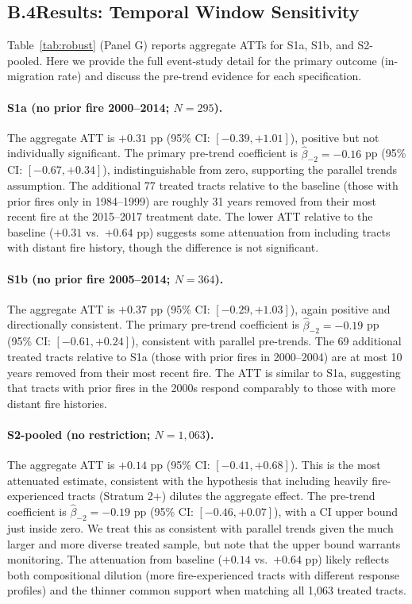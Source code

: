 \documentclass[12pt]{article}
\begin{document}
\subsection*{B.4\quad Results: Temporal Window Sensitivity}

Table~\ref{tab:robust} (Panel G) reports aggregate ATTs for S1a, S1b, and S2-pooled.
Here we provide the full event-study detail for the primary outcome (in-migration rate)
and discuss the pre-trend evidence for each specification.

\paragraph{S1a (no prior fire 2000--2014; $N = 295$).}
The aggregate ATT is $+0.31$ pp (95\% CI: $[-0.39, +1.01]$), positive but not
individually significant.
The primary pre-trend coefficient is $\hat{\beta}_{-2} = -0.16$ pp
(95\% CI: $[-0.67, +0.34]$), indistinguishable from zero, supporting the parallel
trends assumption.
The additional 77 treated tracts relative to the baseline (those with prior fires
only in 1984--1999) are roughly 31 years removed from their most recent fire at
the 2015--2017 treatment date.
The lower ATT relative to the baseline ($+0.31$ vs.\ $+0.64$ pp) suggests
some attenuation from including tracts with distant fire history, though the
difference is not significant.

\paragraph{S1b (no prior fire 2005--2014; $N = 364$).}
The aggregate ATT is $+0.37$ pp (95\% CI: $[-0.29, +1.03]$), again positive and
directionally consistent.
The primary pre-trend coefficient is $\hat{\beta}_{-2} = -0.19$ pp
(95\% CI: $[-0.61, +0.24]$), consistent with parallel pre-trends.
The 69 additional treated tracts relative to S1a (those with prior fires in
2000--2004) are at most 10 years removed from their most recent fire.
The ATT is similar to S1a, suggesting that tracts with prior fires in the 2000s
respond comparably to those with more distant fire histories.

\paragraph{S2-pooled (no restriction; $N = 1{,}063$).}
The aggregate ATT is $+0.14$ pp (95\% CI: $[-0.41, +0.68]$).
This is the most attenuated estimate, consistent with the hypothesis that including
heavily fire-experienced tracts (Stratum 2+) dilutes the aggregate effect.
The pre-trend coefficient is $\hat{\beta}_{-2} = -0.19$ pp
(95\% CI: $[-0.46, +0.07]$), with a CI upper bound just inside zero.
We treat this as consistent with parallel trends given the much larger and more
diverse treated sample, but note that the upper bound warrants monitoring.
The attenuation from baseline ($+0.14$ vs.\ $+0.64$ pp) likely reflects both
compositional dilution (more fire-experienced tracts with different response profiles)
and the thinner common support when matching all 1,063 treated tracts.
\end{document}

